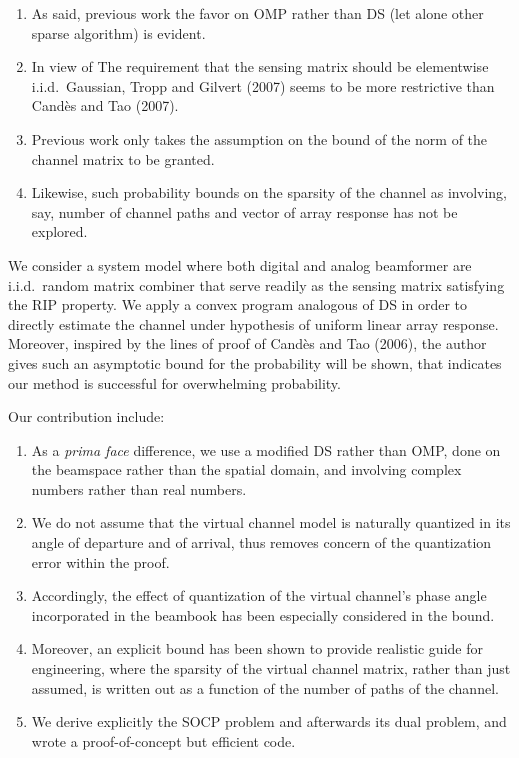 \documentclass[12pt]{article}
\begin{document}
\begin{enumerate}
\item As said, previous work the favor on OMP rather than DS (let alone other sparse algorithm) is evident.
\item In view of The requirement that the sensing matrix should be elementwise i.i.d.\ Gaussian, Tropp and Gilvert (2007) seems to be more restrictive than Cand\`es and Tao (2007).
\item Previous work only takes the assumption on the bound of the norm of the channel matrix to be granted.
\item Likewise, such probability bounds on the sparsity of the channel as involving, say, number of channel paths and vector of array response has not be explored.
\end{enumerate}

We consider a system model where both digital and analog beamformer are i.i.d.\ random matrix combiner that serve readily as the sensing matrix satisfying the RIP property.
We apply a convex program analogous of DS in order to directly estimate the channel under hypothesis of uniform linear array response.
Moreover, inspired by the lines of proof of Cand\`es and Tao (2006), the author gives such an asymptotic bound for the probability will be shown, that indicates our method is successful for overwhelming probability.

Our contribution include:

\begin{enumerate}
\item As a \textit{prima face} difference, we use a modified DS rather than OMP, done on the beamspace rather than the spatial domain, and involving complex numbers rather than real numbers.
\item We do not assume that the virtual channel model is naturally quantized in its angle of departure and of arrival, thus removes concern of the quantization error within the proof.
\item Accordingly, the effect of quantization of the virtual channel's phase angle incorporated in the beambook has been especially considered in the bound.
\item Moreover, an explicit bound has been shown to provide realistic guide for engineering, where the sparsity of the virtual channel matrix, rather than just assumed, is written out as a function of the number of paths of the channel.
\item We derive explicitly the SOCP problem and afterwards its dual problem, and wrote a proof-of-concept but efficient code.
\end{enumerate}
\end{document}
